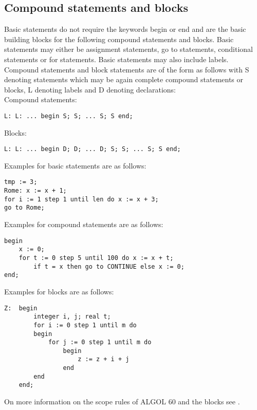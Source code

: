 \documentclass{article}
\begin{document}
\subsection{Compound statements and blocks} \label{compStatsBlocks}
Basic statements do not require the keywords begin or end and are the basic building blocks for the following compound statements and blocks. Basic statements may either be assignment statements, go to statements, conditional statements or for statements. Basic statements may also include labels.\\

Compound statements and block statements are of the form as follows with S denoting statements which may be again complete compound statements or blocks, L denoting labels and D denoting declarations:\\

Compound statements:
\begin{lstlisting}[language={[60]algol}]
L: L: ... begin S; S; ... S; S end;
\end{lstlisting}

Blocks:
\begin{lstlisting}[language={[60]algol}]
L: L: ... begin D; D; ... D; S; S; ... S; S end;
\end{lstlisting}

Examples for basic statements are as follows:\\ 
\begin{lstlisting}[language={[60]algol}]
tmp := 3;
Rome: x := x + 1;
for i := 1 step 1 until len do x := x + 3;
go to Rome;
\end{lstlisting}

Examples for compound statements are as follows:\\
\begin{lstlisting}[language={[60]algol}]
begin
    x := 0;
    for t := 0 step 5 until 100 do x := x + t;
        if t = x then go to CONTINUE else x := 0;
end;
\end{lstlisting}

Examples for blocks are as follows:\\ 
\begin{lstlisting}[language={[60]algol}]
Z:  begin 
        integer i, j; real t;
        for i := 0 step 1 until m do
        begin
            for j := 0 step 1 until m do
                begin
                    z := z + i + j
                end
        end
    end;
\end{lstlisting}

On more information on the scope rules of ALGOL 60 and the blocks see .
\end{document}
